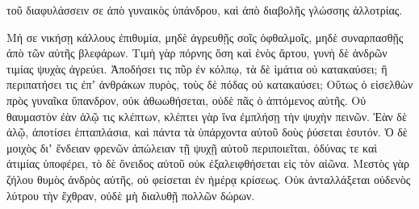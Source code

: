 {τοῦ διαφυλάσσειν σε ἀπὸ γυναικὸς ὑπάνδρου, καὶ ἀπὸ διαβολῆς γλώσσης ἀλλοτρίας.
\par }{\PP {}Μή σε νικήσῃ κάλλους ἐπιθυμία, μηδὲ ἀγρευθῇς σοῖς ὀφθαλμοῖς, μηδὲ συναρπασθῇς ἀπὸ τῶν αὐτῆς βλεφάρων.
Τιμὴ γὰρ πόρνης ὅση καὶ ἑνὸς ἄρτου, γυνὴ δὲ ἀνδρῶν τιμίας ψυχὰς ἀγρεύει.
Ἀποδήσει τις πῦρ ἐν κόλπῳ, τὰ δὲ ἱμάτια οὐ κατακαύσει;
ἢ περιπατήσει τις ἐπʼ ἀνθράκων πυρὸς, τοὺς δὲ πόδας οὐ κατακαύσει;
Οὕτως ὁ εἰσελθὼν πρὸς γυναῖκα ὕπανδρον, οὐκ ἀθωωθήσεται, οὐδὲ πᾶς ὁ ἁπτόμενος αὐτῆς.
Οὐ θαυμαστὸν ἐὰν ἁλῷ τις κλέπτων, κλέπτει γὰρ ἵνα ἐμπλήσῃ τὴν ψυχὴν πεινῶν.
Ἐὰν δὲ ἁλῷ, ἀποτίσει ἑπταπλάσια, καὶ πάντα τὰ ὑπάρχοντα αὐτοῦ δοὺς ῥύσεται ἑσυτόν.
Ὁ δὲ μοιχὸς διʼ ἔνδειαν φρενῶν ἀπώλειαν τῇ ψυχῇ αὐτοῦ περιποιεῖται,
ὀδύνας τε καὶ ἀτιμίας ὑποφέρει, τὸ δὲ ὄνειδος αὐτοῦ οὐκ ἐξαλειφθήσεται εἰς τὸν αἰῶνα.
Μεστὸς γὰρ ζήλου θυμὸς ἀνδρὸς αὐτῆς, οὐ φείσεται ἐν ἡμέρᾳ κρίσεως.
Οὐκ ἀνταλλάξεται οὐδενὸς λύτρου τὴν ἔχθραν, οὐδὲ μὴ διαλυθῇ πολλῶν δώρων.

}

